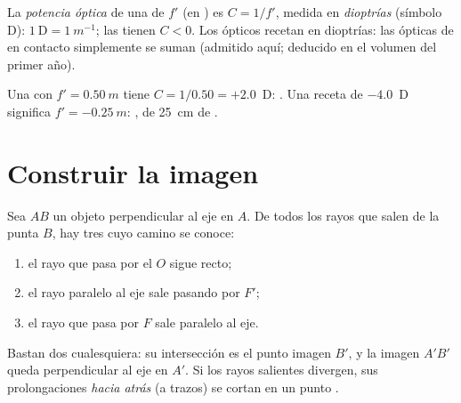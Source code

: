\begin{definition}\label{def:g11:lenses-and-eye:vergence}
La \emph{potencia óptica} de una  de
 $f'$ (en ) es $C = 1/f'$, medida en
\emph{dioptrías} (símbolo D):
$1~\text{D} = \qty{1}{m^{-1}}$; las  tienen $C < 0$.
Los ópticos recetan en dioptrías: las  ópticas de  en contacto simplemente se suman (admitido aquí; deducido en el
volumen del primer año).
\end{definition}

\begin{example}\label{ex:g11:lenses-and-eye:vergence}
Una  con $f' = \qty{0.50}{m}$ tiene $C = 1/0.50 = +2.0$~D:
. Una receta de $-4.0$~D significa $f' = \qty{-0.25}{m}$:
, de \qty{25}{cm} de .
\end{example}

\section{Construir la imagen}

\begin{method}\label{met:g11:lenses-and-eye:rays}
Sea $AB$ un objeto perpendicular al eje en $A$. De todos los rayos que
salen de la punta $B$, hay tres cuyo camino se conoce:
\begin{enumerate}
  \item el rayo que pasa por el  $O$ sigue recto;
  \item el rayo paralelo al eje sale pasando por $F'$;
  \item el rayo que pasa por $F$ sale paralelo al eje.
\end{enumerate}
Bastan dos cualesquiera: su intersección es el punto imagen $B'$, y la
imagen $A'B'$ queda perpendicular al eje en $A'$. Si los rayos salientes
divergen, sus prolongaciones \emph{hacia atrás} (a trazos) se cortan en
un punto .
\end{method}

